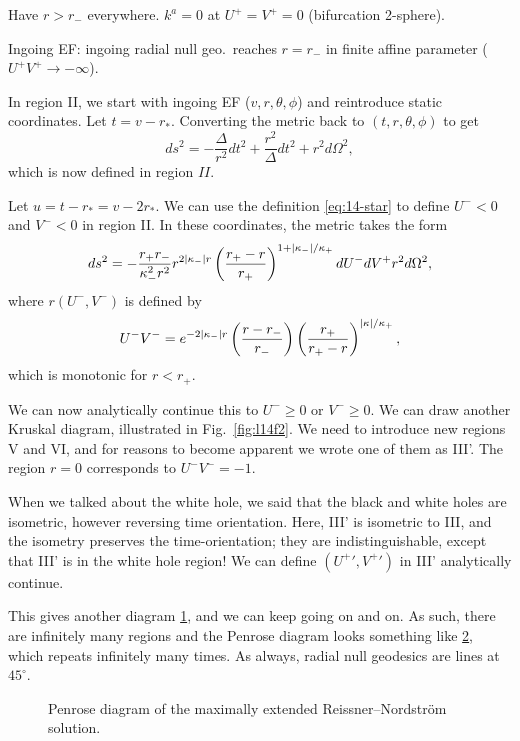Have $r > r_-$ everywhere.
$k^a = 0$ at $U^+ = V^+ = 0$ (bifurcation 2-sphere).

Ingoing EF: ingoing radial null geo.~reaches $r = r_-$ in finite affine parameter ($U^+ V^+ \to -\infty$).

In region II, we start with ingoing EF ($v, r, \theta, \phi$) and reintroduce static coordinates.
Let $t = v - r_*$.
Converting the metric back to $(t, r, \theta, \phi)$ to get
\begin{equation}
  ds^2 =-\frac{\Delta}{r^2} dt^2 + \frac{r^2}{\Delta} dt^2 + r^2 d\Omega^2,
\end{equation}
which is now defined in region $II$.

Let $u = t - r_* = v - 2 r_*$.
We can use the definition \eqref{eq:14-star} to define $U^- < 0$ and $V^- < 0$ in region II.
In these coordinates, the metric takes the form
\begin{equation}
  ds^2 = - \frac{r_+ r_-}{\kappa_-^2 r^2} r^{2 \abs{\kappa_-} r} \left( \frac{r_+ - r}{r_+} \right)^{1 + \abs{\kappa_-}/\kappa_+} dU^- dV^ + r^2 d\Omega^2,
\end{equation}
where $r(U^-, V^-)$ is defined by
\begin{equation}
  U^- V^- = e^{-2 \abs{\kappa_-} r} \left( \frac{r - r_-}{r_-} \right) \left( \frac{r_+}{r_+ - r} \right)^{\abs{\kappa}/ \kappa_+},
\end{equation}
which is monotonic for $r < r_+$.

We can now analytically continue this to $U^- \geq 0$ or $V^- \geq 0$.
We can draw another Kruskal diagram, illustrated in Fig.~\ref{fig:l14f2}.
We need to introduce new regions V and VI, and for reasons to become apparent we wrote one of them as III'.
The region $r = 0$ corresponds to $U^- V^- = -1$.

When we talked about the white hole, we said that the black and white holes are isometric, however reversing time orientation.
Here, III' is isometric to III, and the isometry preserves the time-orientation; they are indistinguishable, except that III' is in the white hole region!
We can define $(U^+{}', V^+{}')$ in III' analytically continue.
\begin{figure}[tbhp]
  \centering
  \def\svgwidth{0.4\columnwidth}
  
  \caption{}
  \label{fig:l14f3}
\end{figure}
This gives another diagram \ref{fig:l14f3}, and we can keep going on and on.
As such, there are infinitely many regions and the Penrose diagram looks something like \ref{fig:l14f4}, which repeats infinitely many times.
As always, radial null geodesics are lines at $45^\circ$.
\begin{figure}[pt]
  \centering
  \def\svgwidth{0.6\columnwidth}
  
  \caption{Penrose diagram of the maximally extended Reissner--Nordström solution.}
  \label{fig:l14f4}
\end{figure}


